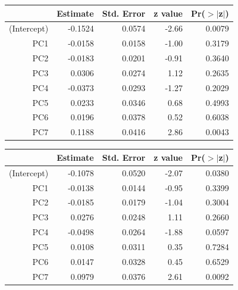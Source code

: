 \documentclass[a4paper,12pt]{Latex/Classes/PhDthesisPSnPDF}
\begin{document}
\newpage
\begin{center}
\begin{table}[ht]
\centering
\begin{tabular}{rrrrr}
  \hline
 & Estimate & Std. Error & z value & Pr($>$$|$z$|$) \\ 
  \hline
(Intercept) & -0.1524 & 0.0574 & -2.66 & 0.0079 \\ 
  PC1 & -0.0158 & 0.0158 & -1.00 & 0.3179 \\ 
  PC2 & -0.0183 & 0.0201 & -0.91 & 0.3640 \\ 
  PC3 & 0.0306 & 0.0274 & 1.12 & 0.2635 \\ 
  PC4 & -0.0373 & 0.0293 & -1.27 & 0.2029 \\ 
  PC5 & 0.0233 & 0.0346 & 0.68 & 0.4993 \\ 
  PC6 & 0.0196 & 0.0378 & 0.52 & 0.6038 \\ 
  PC7 & 0.1188 & 0.0416 & 2.86 & 0.0043 \\ 
   \hline
\end{tabular}
\end{table}\end{center}
\begin{center}
\begin{table}[ht]
\centering
\begin{tabular}{rrrrr}
  \hline
 & Estimate & Std. Error & z value & Pr($>$$|$z$|$) \\ 
  \hline
(Intercept) & -0.1078 & 0.0520 & -2.07 & 0.0380 \\ 
  PC1 & -0.0138 & 0.0144 & -0.95 & 0.3399 \\ 
  PC2 & -0.0185 & 0.0179 & -1.04 & 0.3004 \\ 
  PC3 & 0.0276 & 0.0248 & 1.11 & 0.2660 \\ 
  PC4 & -0.0498 & 0.0264 & -1.88 & 0.0597 \\ 
  PC5 & 0.0108 & 0.0311 & 0.35 & 0.7284 \\ 
  PC6 & 0.0147 & 0.0328 & 0.45 & 0.6529 \\ 
  PC7 & 0.0979 & 0.0376 & 2.61 & 0.0092 \\ 
   \hline
\end{tabular}
\end{table}\end{center}
\end{document}

